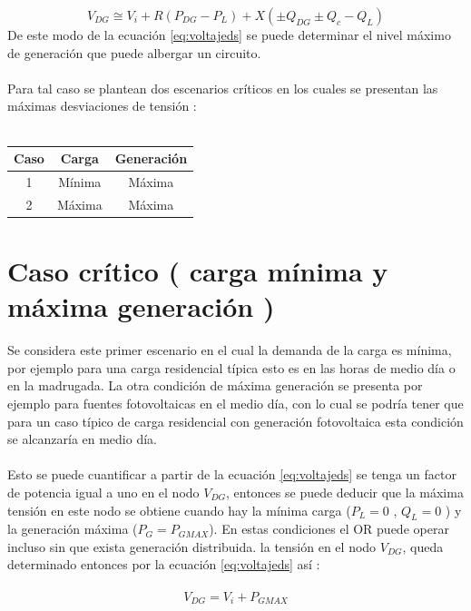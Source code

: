 \documentclass[12pt, letterpaper]{report}
\begin{document}
\begin{equation}
V_{DG} \cong V_{i} + R (P_{DG} - P_{L}) + X(\pm Q_{DG} \pm Q_{c} - Q_{L})
\label{eq:voltajeds}
\end{equation}
De este modo  de la ecuación \ref{eq:voltajeds} se puede determinar  el nivel máximo de generación que puede  albergar un circuito.\\\\
Para tal caso se plantean dos escenarios críticos en los cuales se presentan las máximas desviaciones de tensión \cite{Elkhatib2011}:\\\\

\begin{tabular}{|c|c|c|}
    \hline 
    Caso 	& Carga 	& Generación \\\hline
    1 		& Mínima	& Máxima \\\hline
    2		& Máxima	& Máxima \\
    \hline
\end{tabular}

\section{Caso crítico ( carga mínima  y máxima generación ) }
Se considera este primer escenario en el cual la demanda de la carga es mínima, por ejemplo  para una carga residencial típica  esto es  en las horas de medio día  o en la madrugada. La otra condición de máxima generación se presenta por ejemplo para fuentes fotovoltaicas  en el medio día,  con lo cual se podría tener que para un caso típico de carga residencial con generación fotovoltaica esta condición se alcanzaría en medio día.\\\\
Esto se puede  cuantificar a partir de la ecuación \ref{eq:voltajeds} se tenga un factor de potencia igual a uno  en el nodo  $V_{DG}$, entonces se puede deducir que la máxima tensión en este nodo se obtiene cuando hay la mínima carga ($P_{L} = 0$ , $Q_{L} = 0$ )  y la generación máxima ($P_{G} = P_{GMAX}$). En estas condiciones el OR puede operar incluso sin que exista generación distribuida. la tensión en el nodo $V_{DG}$, queda determinado entonces por la ecuación \ref{eq:voltajeds} así \cite{strbac2002integration} :\\\\
\begin{equation}
V_{DG} = V_{i} + P_{GMAX}
\label{eq:vgmax}
\end{equation}
\end{document}
